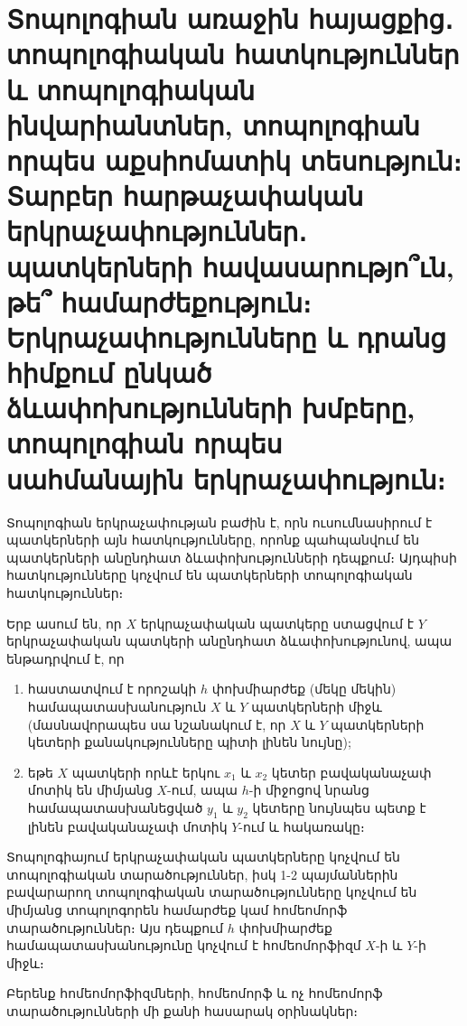 \documentclass[./main.tex]{subfiles}
\begin{document}
\onehalfspacing
\section{Տոպոլոգիան առաջին հայացքից․ տոպոլոգիական հատկություններ և տոպոլոգիական ինվարիանտներ, տոպոլոգիան որպես աքսիոմատիկ տեսություն։ Տարբեր հարթաչափական երկրաչափություններ․ պատկերների հավասարությո՞ւն, թե՞ համարժեքություն։ Երկրաչափությունները և դրանց հիմքում ընկած ձևափոխությունների խմբերը, տոպոլոգիան որպես սահմանային երկրաչափություն։}\label{sec:0}


\par Տոպոլոգիան երկրաչափության բաժին է, որն ուսումնասիրում է պատկերների այն հատկությունները, որոնք պահպանվում են պատկերների անընդհատ ձևափոխությունների դեպքում։ Այդպիսի հատկությունները կոչվում են պատկերների տոպոլոգիական հատկություններ։
\par Երբ ասում են, որ $X$ երկրաչափական պատկերը ստացվում է $Y$ երկրաչափական պատկերի անընդհատ ձևափոխությունով, ապա ենթադրվում է, որ
\begin{enumerate}
\item հաստատվում է որոշակի $h$ փոխմիարժեք (մեկը մեկին) համապատասխանություն $X$ և $Y$ պատկերների միջև (մասնավորապես սա նշանակում է, որ $X$ և $Y$ պատկերների կետերի քանակությունները պիտի լինեն նույնը);
\item եթե $X$ պատկերի որևէ երկու $x_1$ և $x_2$ կետեր բավականաչափ մոտիկ են միմյանց $X$-ում, ապա $h$-ի միջոցով նրանց համապատասխանեցված $y_1$ և $y_2$ կետերը նույնպես պետք է լինեն բավականաչափ մոտիկ $Y$-ում և հակառակը։
\end{enumerate}
Տոպոլոգիայում երկրաչափական պատկերները կոչվում են տոպոլոգիական տա\-րա\-ծություններ, իսկ 1-2 պայմաններին բավարարող տոպոլոգիական տարածու\-թյունները կոչվում են միմյանց տոպոլոգորեն համարժեք կամ հոմեոմորֆ տարածություններ։ Այս դեպքում $h$ փոխմիարժեք համապատասխանությունը կոչվում է հոմեոմորֆիզմ $X$-ի և $Y$-ի միջև։
\par Բերենք հոմեոմորֆիզմների, հոմեոմորֆ և ոչ հոմեոմորֆ տարածությունների մի քանի հասարակ օրինակներ։
\end{document}
